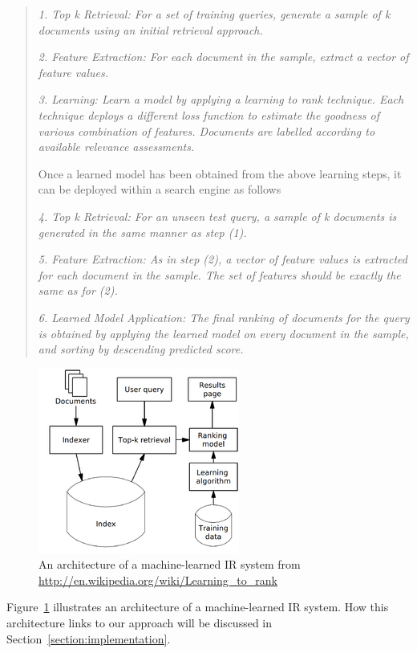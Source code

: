 \begin{quote}
  \item \textit{1. Top k Retrieval: For a set of training queries, generate a sample of k documents using an initial retrieval approach.}
  \item \textit{2. Feature Extraction: For each document in the sample, extract a vector of feature values.}
  \item \textit{3. Learning: Learn a model by applying a learning to rank technique. Each technique deploys a different loss function to estimate the goodness of
	various combination of features. Documents are labelled according to available relevance assessments.}

Once a learned model has been obtained from the above learning steps, it can be deployed within a search engine as follows~\cite[P. 4]{learningmodel}

 \item \textit{4. Top k Retrieval: For an unseen test query, a sample of k documents is generated in the same manner as step (1).}
 \item \textit{5. Feature Extraction: As in step (2), a vector of feature values is extracted for each document in the sample. The set of features should be exactly
	the same as for (2).}
 \item \textit{6. Learned Model Application: The final ranking of documents for the query is obtained by applying the learned model on every document in the sample,
	and sorting by descending predicted score.}
\end{quote}

\begin{figure}
\centering
\includegraphics[scale=0.7]{./figures/letor.png}
\caption{An architecture of a machine-learned IR system from \protect\url{http://en.wikipedia.org/wiki/Learning_to_rank}} \label{fig:letor} 
\end{figure}
Figure~\ref{fig:letor} illustrates an architecture of a machine-learned IR system. How this architecture links to our approach will be discussed in
Section~\ref{section:implementation}.

